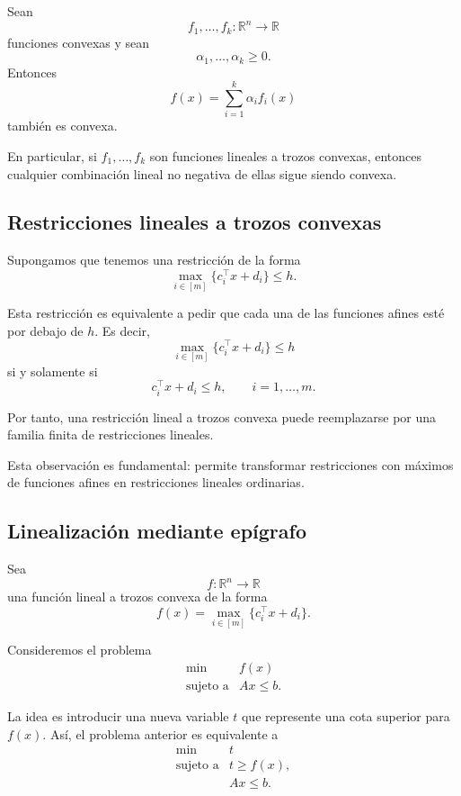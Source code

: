 Sean
\[
    f_1,\dots,f_k:\mathbb{R}^n\to\mathbb{R}
\]
funciones convexas y sean
\[
    \alpha_1,\dots,\alpha_k\geq 0.
\]
Entonces
\[
    f(x)
    =
    \sum_{i=1}^{k}\alpha_i f_i(x)
\]
también es convexa.

En particular, si \(f_1,\dots,f_k\) son funciones lineales a trozos convexas, entonces cualquier combinación lineal no negativa de ellas sigue siendo convexa.

\subsection{Restricciones lineales a trozos convexas}

Supongamos que tenemos una restricción de la forma
\[
    \max_{i\in[m]}
    \{c_i^\top x+d_i\}
    \leq h.
\]

Esta restricción es equivalente a pedir que cada una de las funciones afines esté por debajo de \(h\). Es decir,
\[
    \max_{i\in[m]}
    \{c_i^\top x+d_i\}
    \leq h
\]
si y solamente si
\[
    c_i^\top x+d_i\leq h,
    \qquad i=1,\dots,m.
\]

Por tanto, una restricción lineal a trozos convexa puede reemplazarse por una familia finita de restricciones lineales.

\begin{remark}
Esta observación es fundamental: permite transformar restricciones con máximos de funciones afines en restricciones lineales ordinarias.
\end{remark}

\subsection{Linealización mediante epígrafo}

Sea
\[
    f:\mathbb{R}^n\to\mathbb{R}
\]
una función lineal a trozos convexa de la forma
\[
    f(x)
    =
    \max_{i\in[m]}
    \{c_i^\top x+d_i\}.
\]

Consideremos el problema
\[
    \begin{array}{ll}
        \min & f(x)\\[1mm]
        \text{sujeto a} & Ax\leq b.
    \end{array}
\]

La idea es introducir una nueva variable \(t\) que represente una cota superior para \(f(x)\). Así, el problema anterior es equivalente a
\[
    \begin{array}{ll}
        \min & t\\[1mm]
        \text{sujeto a} & t\geq f(x),\\
        & Ax\leq b.
    \end{array}
\]

